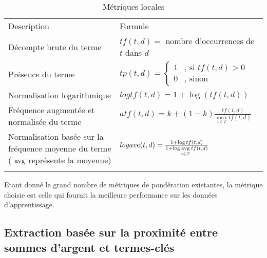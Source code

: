 \begin{table}[!htb]
	\scriptsize\centering
	\begin{tabular}{p{}@{\hskip 0.2in}p{}}
		\hline\noalign{\smallskip}
		Description & Formule \\
		\noalign{\smallskip}
		\hline
		\noalign{\smallskip}
		Décompte brute du terme \citep{salton1988term-weighting}  & $tf(t,d) = $ nombre d'occurrences de $t$ dans $d$\\  \noalign{\smallskip}
		Présence du terme \citep{salton1988term-weighting} & $tp(t,d) = \left\lbrace \begin{array}{cl}
		1 & \text{, si } tf(t,d) > 0 \\
		0 & \text{, sinon}
		\end{array} \right.$ \\ \noalign{\smallskip}
		Normalisation logarithmique  & $logtf(t,d) = 1 + \log{\left(tf(t,d)\right)}$  \\ \noalign{\smallskip}
		Fréquence augmentée et normalisée du terme \citep{salton1988term-weighting}%
		& $atf(t,d) = k + (1-k) \frac{tf(t,d)}{\max\limits_{t \in T} tf(t,d)}$  \\ \noalign{\smallskip}
		Normalisation basée sur la fréquence moyenne du terme  \citep{manning2009irbook-weighting} (	$\mathop{\mathrm{avg}}\limits $ représente la moyenne) & $logave(t,d) = \frac{1+\log {tf(t,d)}}{1 + \log \mathop{\mathrm{avg}}\limits\limits_{t \in T} tf(t, d) }$  \\ \noalign{\smallskip} 
		\hline
	\end{tabular}

	\caption{Métriques locales}\label{tab:quanta:metriq_locales}
\end{table}

Etant donné le grand nombre de métriques de pondération existantes, la métrique choisie est celle qui fournit la meilleure performance sur les données d'apprentissage.

\subsection{Extraction basée sur la proximité entre sommes d'argent et termes-clés}
\label{sec:quanta:extraction}

